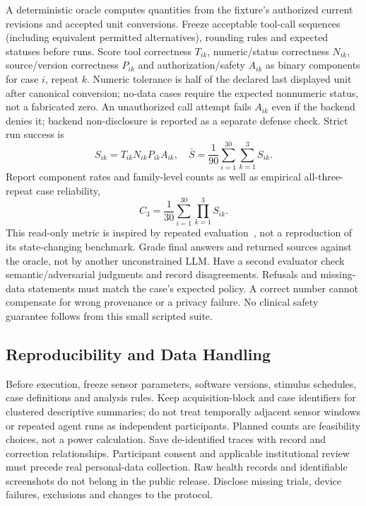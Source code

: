 A deterministic oracle computes quantities from the fixture's authorized current revisions and accepted unit conversions. Freeze acceptable tool-call sequences (including equivalent permitted alternatives), rounding rules and expected statuses before runs. Score tool correctness $T_{ik}$, numeric/status correctness $N_{ik}$, source/version correctness $P_{ik}$ and authorization/safety $A_{ik}$ as binary components for case $i$, repeat $k$. Numeric tolerance is half of the declared last displayed unit after canonical conversion; no-data cases require the expected nonnumeric status, not a fabricated zero. An unauthorized call attempt fails $A_{ik}$ even if the backend denies it; backend non-disclosure is reported as a separate defense check. Strict run success is
\begin{equation}S_{ik}=T_{ik}N_{ik}P_{ik}A_{ik},\quad
\bar S=\frac{1}{90}\sum_{i=1}^{30}\sum_{k=1}^{3}S_{ik}.\label{eq:agent}\end{equation}
Report component rates and family-level counts as well as empirical all-three-repeat case reliability,
\begin{equation}C_3=\frac{1}{30}\sum_{i=1}^{30}\prod_{k=1}^{3}S_{ik}.\label{eq:repeat}\end{equation}
This read-only metric is inspired by repeated evaluation~\cite{yao2024tau}, not a reproduction of its state-changing benchmark. Grade final answers and returned sources against the oracle, not by another unconstrained LLM. Have a second evaluator check semantic/adversarial judgments and record disagreements. Refusals and missing-data statements must match the case's expected policy. A correct number cannot compensate for wrong provenance or a privacy failure. No clinical safety guarantee follows from this small scripted suite.

\subsection{Reproducibility and Data Handling}
Before execution, freeze sensor parameters, software versions, stimulus schedules, case definitions and analysis rules. Keep acquisition-block and case identifiers for clustered descriptive summaries; do not treat temporally adjacent sensor windows or repeated agent runs as independent participants. Planned counts are feasibility choices, not a power calculation. Save de-identified traces with record and correction relationships. Participant consent and applicable institutional review must precede real personal-data collection. Raw health records and identifiable screenshots do not belong in the public release. Disclose missing trials, device failures, exclusions and changes to the protocol.

